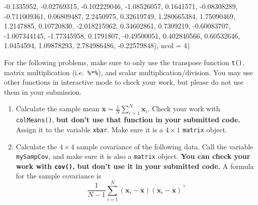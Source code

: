\documentclass[
  12pt,
  krantz2]{krantz}
\makeatletter
\newenvironment{Shaded}{\begin{snugshade}}{\end{snugshade}}
\newcommand{\AttributeTok}[1]{\textcolor[rgb]{0.61,0.61,0.61}{#1}}
\newcommand{\DecValTok}[1]{\textcolor[rgb]{0.06,0.06,0.06}{#1}}
\newcommand{\FloatTok}[1]{\textcolor[rgb]{0.06,0.06,0.06}{#1}}
\newcommand{\NormalTok}[1]{#1}
\newcommand{\SpecialCharTok}[1]{\textcolor[rgb]{0,0,0}{#1}}
\newenvironment{kframe}{%
\medskip{}
\setlength{\fboxsep}{.8em}
 \def\at@end@of@kframe{}%
 \ifinner\ifhmode%
  \def\at@end@of@kframe{\end{minipage}}%
  \begin{minipage}{\columnwidth}%
 \fi\fi%
 \def\FrameCommand##1{\hskip\@totalleftmargin \hskip-\fboxsep
 \colorbox{shadecolor}{##1}\hskip-\fboxsep
     \hskip-\linewidth \hskip-\@totalleftmargin \hskip\columnwidth}%
 \MakeFramed {\advance\hsize-\width
   \@totalleftmargin\z@ \linewidth\hsize
   \@setminipage}}%
 {\par\unskip\endMakeFramed%
 \at@end@of@kframe}
\renewenvironment{Shaded}{\begin{kframe}}{\end{kframe}}
\makeatother
\begin{document}
\begin{Shaded}
\begin{Highlighting}[]
  \SpecialCharTok{{-}}\FloatTok{0.1335952}\NormalTok{, }\SpecialCharTok{{-}}\FloatTok{0.02769315}\NormalTok{, }\SpecialCharTok{{-}}\FloatTok{0.102229046}\NormalTok{, }\SpecialCharTok{{-}}\FloatTok{1.08526057}\NormalTok{,}
  \FloatTok{0.1641571}\NormalTok{, }\SpecialCharTok{{-}}\FloatTok{0.08308289}\NormalTok{, }\SpecialCharTok{{-}}\FloatTok{0.711009361}\NormalTok{,  }\FloatTok{0.06809487}\NormalTok{,}
  \FloatTok{2.2450975}\NormalTok{,  }\FloatTok{0.32619749}\NormalTok{,  }\FloatTok{1.280665384}\NormalTok{,  }\FloatTok{1.75090469}\NormalTok{,}
  \FloatTok{1.2147885}\NormalTok{,  }\FloatTok{0.10720830}\NormalTok{, }\SpecialCharTok{{-}}\FloatTok{2.018215962}\NormalTok{,  }\FloatTok{0.34602861}\NormalTok{,}
  \FloatTok{0.7309219}\NormalTok{, }\SpecialCharTok{{-}}\FloatTok{0.60083707}\NormalTok{, }\SpecialCharTok{{-}}\FloatTok{1.007344145}\NormalTok{, }\SpecialCharTok{{-}}\FloatTok{1.77345958}\NormalTok{,}
  \FloatTok{0.1791807}\NormalTok{, }\SpecialCharTok{{-}}\FloatTok{0.49500051}\NormalTok{,  }\FloatTok{0.402840566}\NormalTok{,  }\FloatTok{0.60532646}\NormalTok{,}
  \FloatTok{1.0454594}\NormalTok{,  }\FloatTok{1.09878293}\NormalTok{,  }\FloatTok{2.784986486}\NormalTok{, }\SpecialCharTok{{-}}\FloatTok{0.22579848}\NormalTok{), }\AttributeTok{ncol =} \DecValTok{4}\NormalTok{)}
\end{Highlighting}
\end{Shaded}

For the following problems, make sure to only use the transpose function \texttt{t()}, matrix multiplication (i.e.~\texttt{\%*\%}), and scalar multiplication/division. You may use other functions in interactive mode to check your work, but please do not use them in your submission.

\begin{enumerate}
\def\labelenumi{\alph{enumi})}
\item
  Calculate the sample mean \(\bar{\mathbf{x}} = \frac{1}{N} \sum_{i=1}^N \mathbf{x}_i\). Check your work with \texttt{colMeans()}, \textbf{but don't use that function in your submitted code.} Assign it to the variable \texttt{xbar}. Make sure it is a \(4 \times 1\) \texttt{matrix} object.
\item
  Calculate the \(4 \times 4\) sample covariance of the following data. Call the variable \texttt{mySampCov}, and make sure it is also a \texttt{matrix} object. \textbf{You can check your work with \texttt{cov()}, but don't use it in your submitted code.} A formula for the sample covariance is
  \begin{equation} 
    \frac{1}{N-1} \sum_{i=1}^N (\mathbf{x}_i - \bar{\mathbf{x}})(\mathbf{x}_i - \bar{\mathbf{x}})^\intercal
    \end{equation}
\end{enumerate}
\end{document}

